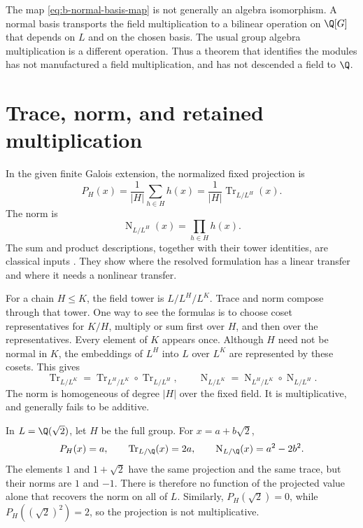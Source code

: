 The map \eqref{eq:b-normal-basis-map} is not generally an algebra isomorphism. A normal basis transports the field multiplication to a bilinear operation on \(\Q[G]\) that depends on \(L\) and on the chosen basis. The usual group algebra multiplication is a different operation. Thus a theorem that identifies the modules has not manufactured a field multiplication, and has not descended a field to \(\Q\).

\section{Trace, norm, and retained multiplication}

In the given finite Galois extension, the normalized fixed projection is
\begin{equation}
 P_H(x)=\frac1{|H|}\sum_{h\in H}h(x)
 =\frac1{|H|}\operatorname{Tr}_{L/L^H}(x).
 \label{eq:b-trace-average}
\end{equation}
The norm is
\begin{equation}
 \operatorname{N}_{L/L^H}(x)=\prod_{h\in H}h(x).
 \label{eq:b-norm-product}
\end{equation}
The sum and product descriptions, together with their tower identities, are classical inputs \cite[Remark 5.47 and Proposition 5.48]{Milne2022}. They show where the resolved formulation has a linear transfer and where it needs a nonlinear transfer.

For a chain \(H\leq K\), the field tower is \(L/L^H/L^K\). Trace and norm compose through that tower. One way to see the formulas is to choose coset representatives for \(K/H\), multiply or sum first over \(H\), and then over the representatives. Every element of \(K\) appears once. Although \(H\) need not be normal in \(K\), the embeddings of \(L^H\) into \(L\) over \(L^K\) are represented by these cosets. This gives
\[
 \operatorname{Tr}_{L/L^K}
 =\operatorname{Tr}_{L^H/L^K}\circ\operatorname{Tr}_{L/L^H},
 \qquad
 \operatorname{N}_{L/L^K}
 =\operatorname{N}_{L^H/L^K}\circ\operatorname{N}_{L/L^H}.
\]
The norm is homogeneous of degree \(|H|\) over the fixed field. It is multiplicative, and generally fails to be additive.

\begin{example}
\label{ex:b-trace-norm-loss}
In \(L=\Q(\sqrt2)\), let \(H\) be the full group. For \(x=a+b\sqrt2\),
\[
 P_H(x)=a,
 \qquad \operatorname{Tr}_{L/\Q}(x)=2a,
 \qquad \operatorname{N}_{L/\Q}(x)=a^2-2b^2.
\]
The elements \(1\) and \(1+\sqrt2\) have the same projection and the same trace, but their norms are \(1\) and \(-1\). There is therefore no function of the projected value alone that recovers the norm on all of \(L\). Similarly, \(P_H(\sqrt2)=0\), while \(P_H((\sqrt2)^2)=2\), so the projection is not multiplicative.
\end{example}

